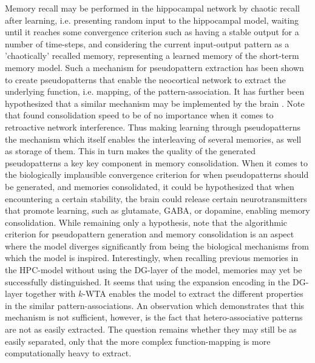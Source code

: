 Memory recall may be performed in the hippocampal network by chaotic recall after learning, i.e. presenting random input to the hippocampal model, waiting until it reaches some convergence criterion such as having a stable output for a number of time-steps, and considering the current input-output pattern as a 'chaotically' recalled memory, representing a learned memory of the short-term memory model. 
Such a mechanism for pseudopattern extraction has been shown to create pseudopatterns that enable the neocortical network to extract the underlying function, i.e. mapping, of the pattern-association. It has further been hypothesized that a similar mechanism may be implemented by the brain \citep{French2001, Ans1997}. Note that \cite{French2001} found consolidation speed to be of no importance when it comes to retroactive network interference. Thus making learning through pseudopatterns the mechanism which itself enables the interleaving of several memories, as well as storage of them. This in turn makes the quality of the generated pseudopatterns a key key component in memory consolidation.
When it comes to the biologically implausible convergence criterion for when pseudopatterns should be generated, and memories consolidated, it could be hypothesized that when encountering a certain stability, the brain could release certain neurotransmitters that promote learning, such as glutamate, GABA, or dopamine, enabling memory consolidation. While remaining only a hypothesis, note that the algorithmic criterion for pseudopattern generation and memory consolidation is an aspect where the model diverges significantly from being the biological mechanisms from which the model is inspired.
Interestingly, when recalling previous memories in the HPC-model without using the DG-layer of the model, memories may yet be successfully distinguished. It seems that using the expansion encoding in the DG-layer together with $k$-WTA enables the model to extract the different properties in the similar pattern-associations. An observation which demonstrates that this mechanism is not sufficient, however, is the fact that hetero-associative patterns are not as easily extracted. The question remains whether they may still be as easily separated, only that the more complex function-mapping is more computationally heavy to extract.


